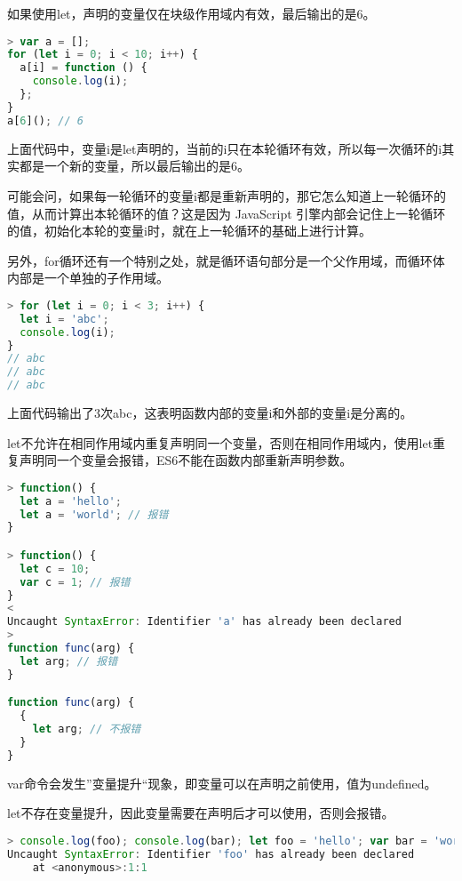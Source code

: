 如果使用let，声明的变量仅在块级作用域内有效，最后输出的是6。

\begin{lstlisting}[language=JavaScript]
> var a = [];
for (let i = 0; i < 10; i++) {
  a[i] = function () {
    console.log(i);
  };
}
a[6](); // 6
\end{lstlisting}

上面代码中，变量i是let声明的，当前的i只在本轮循环有效，所以每一次循环的i其实都是一个新的变量，所以最后输出的是6。

可能会问，如果每一轮循环的变量i都是重新声明的，那它怎么知道上一轮循环的值，从而计算出本轮循环的值？这是因为 JavaScript 引擎内部会记住上一轮循环的值，初始化本轮的变量i时，就在上一轮循环的基础上进行计算。

另外，for循环还有一个特别之处，就是循环语句部分是一个父作用域，而循环体内部是一个单独的子作用域。

\begin{lstlisting}[language=JavaScript]
> for (let i = 0; i < 3; i++) {
  let i = 'abc';
  console.log(i);
}
// abc
// abc
// abc
\end{lstlisting}

上面代码输出了3次abc，这表明函数内部的变量i和外部的变量i是分离的。

let不允许在相同作用域内重复声明同一个变量，否则在相同作用域内，使用let重复声明同一个变量会报错，ES6不能在函数内部重新声明参数。


\begin{lstlisting}[language=JavaScript]
> function() {
  let a = 'hello';
  let a = 'world'; // 报错
}

> function() {
  let c = 10;
  var c = 1; // 报错
}
< 
Uncaught SyntaxError: Identifier 'a' has already been declared
>
function func(arg) {
  let arg; // 报错
}

function func(arg) {
  {
    let arg; // 不报错
  }
}
\end{lstlisting}

\begin{compactitem}
\item var命令会发生”变量提升“现象，即变量可以在声明之前使用，值为undefined。
\item let不存在变量提升，因此变量需要在声明后才可以使用，否则会报错。
\end{compactitem}


\begin{lstlisting}[language=JavaScript]
> console.log(foo); console.log(bar); let foo = 'hello'; var bar = 'world';
Uncaught SyntaxError: Identifier 'foo' has already been declared
    at <anonymous>:1:1
\end{lstlisting}

